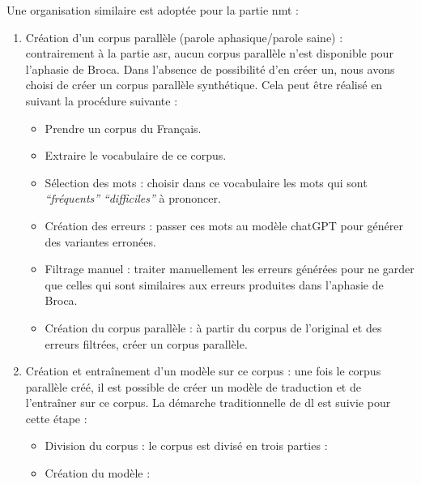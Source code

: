 Une organisation similaire est adoptée pour la partie \gls{nmt} :
\begin{enumerate}[label=(\roman*)]
    \item Création d'un corpus parallèle (parole aphasique/parole saine) :
    contrairement à la partie \gls{asr}, aucun corpus parallèle n'est disponible pour l'aphasie de Broca.
    Dans l'absence de possibilité d'en créer un, nous avons choisi de créer un corpus parallèle synthétique.
    Cela peut être réalisé en suivant la procédure suivante :
    \begin{itemize}
        \item Prendre un corpus du Français.
        \item Extraire le vocabulaire de ce corpus.
        \item Sélection des mots : 
        choisir dans ce vocabulaire les mots qui sont \emph{``fréquents''} \emph{``difficiles''} à prononcer.
        \item Création des erreurs :
        passer ces mots au modèle chatGPT pour générer des variantes erronées.
        \item Filtrage manuel :
        traiter manuellement les erreurs générées pour ne garder que celles qui sont similaires aux erreurs produites dans l'aphasie de Broca.
        \item Création du corpus parallèle :
        à partir du corpus de l'original et des erreurs filtrées, créer un corpus parallèle.
    \end{itemize}
    \item Création et entraînement d'un modèle sur ce corpus :
    une fois le corpus parallèle créé, 
    il est possible de créer un modèle de traduction et de l'entraîner sur ce corpus.
    La démarche traditionnelle de \gls{dl} est suivie pour cette étape :
    \begin{itemize}
        \item Division du corpus :
        le corpus est divisé en trois parties :
        \item Création du modèle :

\end{itemize}
\end{enumerate}
